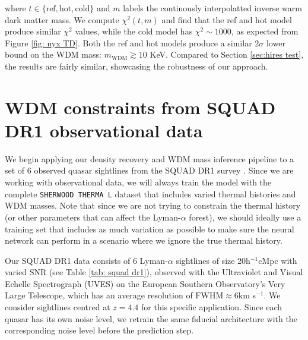 where $t\in \{\mathrm{ref}, \mathrm{hot}, \mathrm{cold} \}$ and $m$ labels the continously interpolatted inverse warm dark matter mass. We compute $\chi^2(t,m)$ and find that the ref and hot model produce similar $\chi^2$ values, while the cold model has $\chi^2 \sim 1000$, as expected from Figure \ref{fig: nyx TD}. Both the ref and hot models produce a similar $2\sigma$ lower bound on the WDM mass: $m_{\mathrm{WDM}} \gtrsim 10$ KeV. Compared to Section \ref{sec:hires test}, the results are fairly similar, showcasing the robustness of our approach.
































\section{WDM constraints from SQUAD DR1 observational data}\label{sec:inference squad}
We begin applying our density recovery and WDM mass inference pipeline to a set of 6 observed quasar sightlines from the SQUAD DR1 survey \cite{Murphy_2018}. Since we are working with observational data, we will always train the model with the complete \texttt{SHERWOOD THERMA L} dataset that includes varied thermal histories and WDM masses. Note that since we are not trying to constrain the thermal history (or other parameters that can affect the Lyman-$\alpha$ forest), we should ideally use a training set that includes as much variation as possible to make sure the neural network can perform in a scenario where we ignore the true thermal history.

Our SQUAD DR1  data consists of 6 Lyman-$\alpha$ sightlines of size 20h$^{-1}$cMpc with varied SNR (see Table \ref{tab: squad dr1}), observed with the Ultraviolet and Visual Echelle Spectrograph (UVES) on the European Southern Observatory’s Very Large Telescope, which has an average resolution of $\mathrm{FWHM}\approx 6$km s$^{-1}$. We consider sightlines centred at $z=4.4$ for this specific application. Since each quasar has its own noise level, we retrain the same fiducial architecture with the corresponding noise level before the prediction step.

